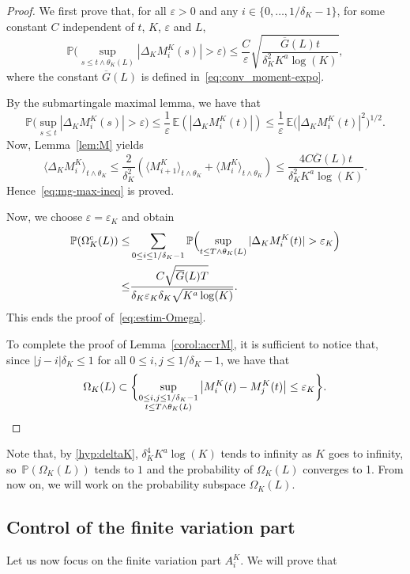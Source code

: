 \documentclass[JEP,XML,SOM,Unicode,published]{cedram}
\theoremstyle{plain}
\theoremstyle{remark}
\begin{document}
\begin{proof}
We first prove that, for all $\varepsilon>0$ and any $i\in\{0,\ldots,1/\delta_K-1\}$, for some constant $C$ independent of $t$, $K$, $\varepsilon$ and $L$,
\begin{equation}
\label{eq:mg-max-ineq}
\mathbb{P}\Big(\sup_{s\le t\wedge \theta_K(L) } |\Delta_KM^K_{i}(s)|>\varepsilon\Big)\leq \frac{C}{\varepsilon} \sqrt{ \frac{ \overline{G}(L) t}{\delta_K^2 K^{a}\log(K)} },
\end{equation}
where the constant $\overline{G}(L)$ is defined in~\eqref{eq:conv_moment-expo}.

By the submartingale maximal lemma, we have that \[ \mathbb{P}\Big(\sup_{s\le t} |\Delta_KM^K_{i}(s)|>\varepsilon\Big)\leq \frac1\varepsilon\,\mathbb{E}(|\Delta_KM^K_{i}(t)|) \leq \frac1\varepsilon\, \mathbb{E}\big(|\Delta_KM^K_{i}(t)|^2\big)^{1/2}.\]
Now, Lemma~\ref{lem:M} yields
\[
\langle\Delta_KM^K_{i} \rangle_{t\wedge \theta_K}
\leq \frac{2}{\delta_K^2}\left(\langle M^K_{i+1} \rangle_{t\wedge \theta_K} + \langle M^K_{i} \rangle_{t\wedge \theta_K}\right)
\leq \frac{ 4 C\overline{G}(L) t}{\delta_K^2 K^{a}\log(K)}.
\]
Hence~\eqref{eq:mg-max-ineq} is proved.

Now, we choose $\varepsilon=\varepsilon_K$ and obtain
\begin{align*}
\mathbb{P}(\Omega_K^c(L))\leq & \sum_{0\leq i\leq 1/\delta_K-1}\mathbb{P}\Bigl(\sup_{t\le T\wedge \theta_K(L)} |\Delta_KM^K_{i}(t)| > \varepsilon_{K}
\Bigr)\\
\leq & \frac{C\sqrt{\overline{G}(L)T}}{\delta_K\varepsilon_K \delta_K \sqrt{K^{a}\log(K)}}.
\end{align*}
This ends the proof of~\eqref{eq:estim-Omega}.

To complete the proof of
Lemma~\ref{corol:accrM}, it is sufficient to notice that, since $|j-i|\delta_K \le 1$ for all $0\leq i,j\leq 1/\delta_K-1$, we have that
\[
\Omega_K(L)\subset\biggl\{\sup_{\substack{0\leq i,j\leq 1/\delta_K-1\\ t\le T\wedge \theta_K(L)}}\left|M^K_i(t)-M^K_j(t)\right|\leq\varepsilon_K\biggr\}. \qedhere
\]
\end{proof}

Note that, by \eqref{hyp:deltaK}, $\delta_K^4 K^{a}\log(K)$ tends to infinity as $K$ goes to infinity, so~$ \mathbb{P}(\Omega_{K}(L))$ tends to $1$ and the probability of $\Omega_{K}(L)$ converges to 1.
From now on, we will work on the probability subspace $\Omega_{K}(L)$.

\subsection{Control of the finite variation part}\label{sec:control-fv}
Let us now focus on the finite variation part $A^K_i$. We will prove that
\end{document}
